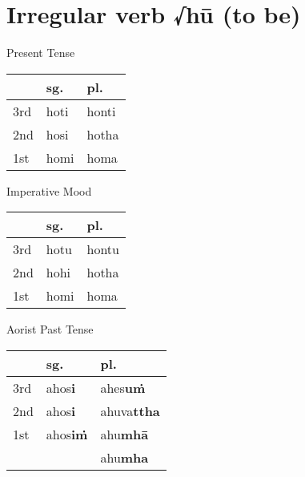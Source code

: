 \documentclass[a4paper]{memoir}
\begin{document}
\section{Irregular verb √hū (to be)}
\label{sec:org9e5f91a}

{\centering\par
\begin{multicols}{3}

Present Tense

\begin{center}
\begin{tabular}{lll}
 & \textbf{sg.} & \textbf{pl.}\\[0pt]
\hline
3rd & hoti & honti\\[0pt]
2nd & hosi & hotha\\[0pt]
1st & homi & homa\\[0pt]
\end{tabular}
\end{center}

\columnbreak

Imperative Mood

\begin{center}
\begin{tabular}{lll}
 & \textbf{sg.} & \textbf{pl.}\\[0pt]
\hline
3rd & hotu & hontu\\[0pt]
2nd & hohi & hotha\\[0pt]
1st & homi & homa\\[0pt]
\end{tabular}
\end{center}

\columnbreak

Aorist Past Tense

\begin{center}
\begin{tabular}{lll}
 & \textbf{sg.} & \textbf{pl.}\\[0pt]
\hline
3rd & ahos\textbf{i} & ahes\textbf{uṁ}\\[0pt]
2nd & ahos\textbf{i} & ahuva\textbf{ttha}\\[0pt]
1st & ahos\textbf{iṁ} & ahu\textbf{mhā}\\[0pt]
 &  & ahu\textbf{mha}\\[0pt]
\end{tabular}
\end{center}

\end{multicols}
\par}
\end{document}
